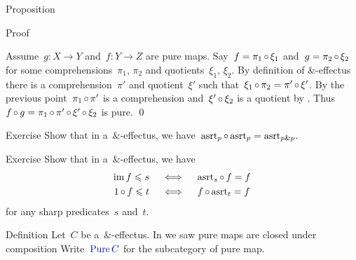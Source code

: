 \documentclass[b]{subfiles}
\begin{document}
\begin{parsec}
\begin{point}{Proposition}
\begin{point}{Proof}
\begin{point}
Assume~$g\colon X \to Y$ and~$f\colon Y \to Z$ are pure maps.
Say~$f = \pi_1 \mathop{\circ} \xi_1$
    and~$g = \pi_2 \mathop{\circ} \xi_2$
    for some comprehensions~$\pi_1$, $\pi_2$
        and quotients~$\xi_1$, $\xi_2$.
By definition of $\&$-effectus
    there is a comprehension~$\pi'$ and quotient~$\xi'$
    such that~$\xi_1 \mathop{\circ} \pi_2 = \pi' \mathop{\circ} \xi'$.
By the previous point~$\pi_1 \mathop{\circ} \pi'$
    is a comprehension
    and~$\xi' \mathop{\circ} \xi_2$ is a quotient by .
Thus
$f \mathop{\circ} g 
=\pi_1 \mathop{\circ} \pi' \mathop{\circ} \xi' \mathop{\circ} \xi_2$
is pure. \qed
\end{point}
\end{point}
\end{point}
\begin{point}{Exercise}%
Show that in a~$\&$-effectus,
    we have~$\mathrm{asrt}_p \mathop{\circ} \mathrm{asrt}_p = \mathrm{asrt}_{p \mathbin{\&} p}$.
\end{point}
\begin{point}{Exercise}%
    Show that in a~$\&$-effectus,
    we have
    \begin{align*}
        \operatorname{im} f \leqslant s \quad&\iff\quad  \mathrm{asrt}_s \mathop{\circ} f = f \\
        1 \mathop{\circ} f \leqslant t \quad&\iff\quad  f \mathop{\circ} \mathrm{asrt}_t = f
    \end{align*}
for any sharp predicates~$s$ and~$t$.
\end{point}
\begin{point}{Definition}%
Let~$C$ be a~$\&$-effectus.
In  we saw pure maps are closed under composition
Write~$\Define{\Pure C}$ for the subcategory
    of pure map.
\end{point}
\end{parsec}
\end{document}
